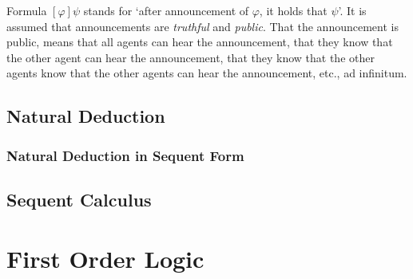\documentclass{article}
\begin{document}
Formula $[\varphi]\psi$ stands for `after announcement of $\varphi$, it holds that $\psi$'. It is assumed that announcements are \emph{truthful} and \emph{public}. That the announcement is public, means that all agents can hear the announcement, that they know that the other agent can hear the announcement, that they know that the other agents know that the other agents can hear the announcement, etc., ad infinitum.
\subsection{Natural Deduction}
\subsubsection{Natural Deduction in Sequent Form}
\subsection{Sequent Calculus}
\section{First Order Logic}
\end{document}
